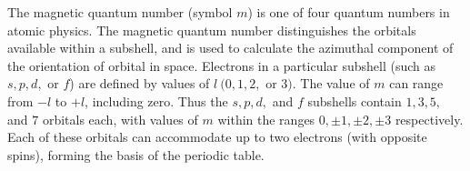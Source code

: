 \begin{chembox}{}
{The magnetic quantum number (symbol $m$) is one of four quantum numbers in atomic physics. The magnetic quantum number distinguishes the orbitals available within a subshell, and is used to calculate the azimuthal component of the orientation of orbital in space. Electrons in a particular subshell (such as $s, p, d,$ or $f$) are defined by values of $l~(0, 1, 2, $ or $ 3)$. The value of $m$ can range from $-l$ to $+l$, including zero. Thus the $s, p, d,$ and $f$ subshells contain $1, 3, 5, $ and $ 7$ orbitals each, with values of $m$ within the ranges $0, \pm 1, \pm 2, \pm 3$ respectively. Each of these orbitals can accommodate up to two electrons (with opposite spins), forming the basis of the periodic table.}
\end{chembox}
